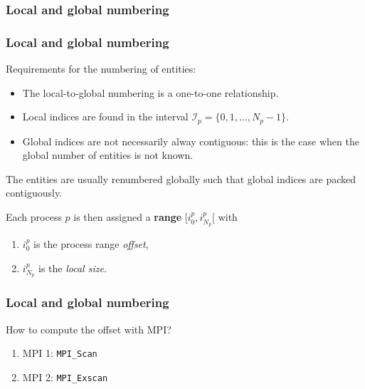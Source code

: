 \begin{frame}
  \frametitle{Local and global numbering}
  \begin{center}
  \end{center}
\end{frame}

\begin{frame}
  \frametitle{Local and global numbering}

Requirements for the numbering of entities:
\begin{itemize}
\item The local-to-global numbering is a one-to-one relationship.
\item Local indices are found in the interval $\mathcal{I}_p = \{0,1,\ldots,N_p-1\}$.
\item Global indices are not necessarily alway contiguous: this is the case when the global number of entities is not known.
\end{itemize}

\medskip
The entities are usually renumbered globally such that global indices are packed contiguously.

\medskip
Each process $p$ is then assigned a \textbf{range} $[ i^p_0, i^p_{N_p}  [$ with
\begin{enumerate}
\item $i^p_0$ is the process range \textit{offset},
\item $i^p_{N_p}$ is the \textit{local size}.
\end{enumerate}

\end{frame}

\begin{frame}
  \frametitle{Local and global numbering}

How to compute the offset with MPI?
\begin{enumerate}
\item MPI 1: \texttt{MPI\_Scan}
\item MPI 2: \texttt{MPI\_Exscan}
\end{enumerate}
\end{frame}

